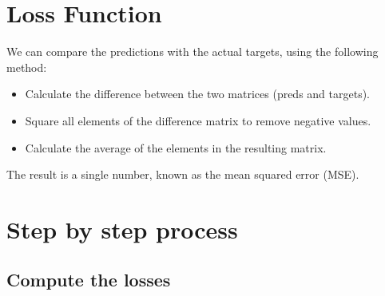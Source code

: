 \documentclass[]{book}
\newenvironment{Shaded}{\begin{snugshade}}{\end{snugshade}}
\newcommand{\CommentTok}[1]{\textcolor[rgb]{0.56,0.35,0.01}{\textit{#1}}}
\newcommand{\ControlFlowTok}[1]{\textcolor[rgb]{0.13,0.29,0.53}{\textbf{#1}}}
\newcommand{\KeywordTok}[1]{\textcolor[rgb]{0.13,0.29,0.53}{\textbf{#1}}}
\newcommand{\NormalTok}[1]{#1}
\newcommand{\OperatorTok}[1]{\textcolor[rgb]{0.81,0.36,0.00}{\textbf{#1}}}
\newcommand{\StringTok}[1]{\textcolor[rgb]{0.31,0.60,0.02}{#1}}
\providecommand{\tightlist}{%
  \setlength{\itemsep}{0pt}\setlength{\parskip}{0pt}}
\begin{document}
\hypertarget{loss-function}{%
\section{Loss Function}\label{loss-function}}

We can compare the predictions with the actual targets, using the following method:

\begin{itemize}
\tightlist
\item
  Calculate the difference between the two matrices (preds and targets).
\item
  Square all elements of the difference matrix to remove negative values.
\item
  Calculate the average of the elements in the resulting matrix.
\end{itemize}

The result is a single number, known as the mean squared error (MSE).

\begin{Shaded}
\end{Shaded}

\hypertarget{step-by-step-process}{%
\section{Step by step process}\label{step-by-step-process}}

\hypertarget{compute-the-losses}{%
\subsection{Compute the losses}\label{compute-the-losses}}
\end{document}
